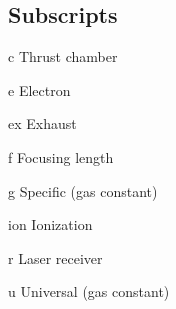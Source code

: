 \begin{multicols*}{2}
    \section*{Subscripts}
    \begin{nomlist}
        \item[c]                Thrust chamber
        \item[e]                Electron
        \item[ex]               Exhaust
        \item[f]                Focusing length
        \item[g]                Specific (gas constant)
        \item[ion]              Ionization
        \item[r]                Laser receiver
        \item[u]                Universal (gas constant)
    \end{nomlist}


\end{multicols*}